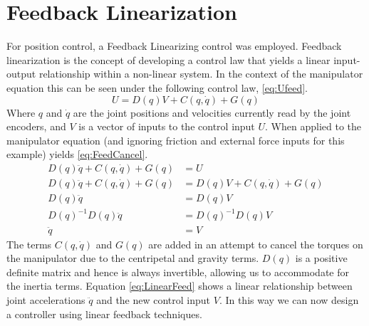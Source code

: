 \documentclass[letterpaper,12pt]{report}
\begin{document}
\section{Feedback Linearization}

For position control, a Feedback Linearizing control was employed. Feedback linearization is the concept of developing
a control law that yields a linear input-output relationship within a non-linear system. In the context of the manipulator
equation this can be seen under the following control law, \eqref{eq:Ufeed}.
\begin{equation} \label{eq:Ufeed}
U = D(q)V + C(q,\dot q) + G(q)
\end{equation}
Where $q$ and $\dot q$ are the joint positions and velocities currently read by the joint encoders, and $V$ is a vector
of inputs to the control input $U$. When applied to the manipulator equation (and ignoring friction and external force 
inputs for this example) yields \eqref{eq:FeedCancel}.
\begin{subequations} \label{eq:FeedCancel}
\begin{align}
	D(q)\ddot q + C(q,\dot q) + G(q) &= U\\
	D(q)\ddot q + C(q,\dot q) + G(q) &= D(q)V + C(q,\dot q) + G(q)\\
	D(q)\ddot q &= D(q)V\\
	D(q)^{-1}D(q)\ddot q &= D(q)^{-1}D(q)V\\
	\ddot q &= V \label{eq:LinearFeed}
\end{align}
\end{subequations}
The terms $C(q,\dot q)$ and $G(q)$ are added in an attempt to cancel the torques on the manipulator due to the centripetal and gravity terms.
$D(q)$ is a positive definite matrix and hence is always invertible, allowing us to accommodate for the inertia terms. Equation \eqref{eq:LinearFeed} 
shows a linear relationship between joint accelerations $\ddot q$ and the new control input $V$. In this way we can now design a controller 
using linear feedback techniques.
\end{document}
